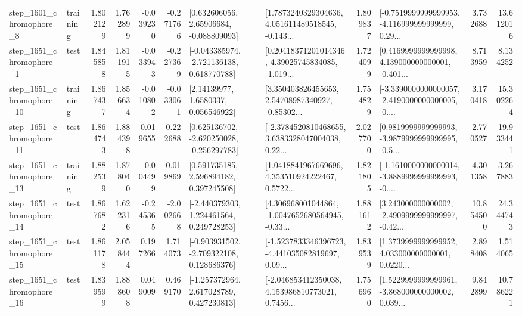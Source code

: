 \begin{tabular}{llrrrrllrlrr}
  step\_1601\_chromophore\_8 &  training &      1.802129 &    1.762899 &     -0.039230 & -0.271766 &     [0.632606056, 2.65906684, -0.088809093] &  [1.7873240329304636, 4.051611489518545, -0.143... &       1.809837 &  [-0.7519999999999953, -4.116999999999999, 0.29... &            3.732688 &         13.612016 \\
  step\_1651\_chromophore\_1 &      test &      1.845858 &    1.811915 &     -0.033943 & -0.227369 &   [-0.043385974, -2.721136138, 0.618770788] &  [0.20418371201014346, 4.39025745834085, -1.019... &       1.724099 &  [0.4169999999999998, 4.139000000000001, -0.401... &            8.713959 &          8.134252 \\
 step\_1651\_chromophore\_10 &  training &      1.867437 &    1.856634 &     -0.010802 & -0.033061 &        [2.14139977, 1.6580337, 0.056546922] &  [3.350403826455653, 2.54708987340927, -0.85302... &       1.754829 &  [-3.3390000000000057, -2.4190000000000005, -0.... &            3.170418 &         15.302264 \\
 step\_1651\_chromophore\_11 &      test &      1.864743 &    1.884398 &      0.019655 &  0.222688 &   [0.625136702, -2.620250028, -0.256297783] &  [-2.3784520810468655, 3.6383328047004038, 0.22... &       2.027700 &  [0.9819999999999993, -3.9879999999999995, -0.5... &            2.770527 &         19.933441 \\
 step\_1651\_chromophore\_13 &  training &      1.882539 &    1.878040 &     -0.004499 &  0.019869 &     [0.591735185, 2.596894182, 0.397245508] &  [1.0418841967669696, 4.353510924222467, 0.5722... &       1.821805 &  [-1.1610000000000014, -3.8889999999999993, -0.... &            4.301358 &          3.267883 \\
 step\_1651\_chromophore\_14 &      test &      1.867682 &    1.622316 &     -0.245365 & -2.002668 &    [-2.440379303, 1.224461564, 0.249728253] &  [4.306968001044864, -1.0047652680564945, -0.33... &       1.881612 &  [3.243000000000002, -2.4909999999999997, -0.42... &           10.854500 &         24.344743 \\
 step\_1651\_chromophore\_15 &      test &      1.861178 &    2.058444 &      0.197266 &  1.714073 &   [-0.903931502, -2.709322108, 0.128686376] &  [-1.5237833346396723, -4.441035082819697, 0.09... &       1.839539 &  [1.3739999999999952, 4.033000000000001, 0.0220... &            2.898408 &          1.514065 \\
 step\_1651\_chromophore\_16 &      test &      1.839599 &    1.888608 &      0.049009 &  0.469170 &    [-1.257372964, 2.617028789, 0.427230813] &  [-2.046853412350038, 4.153986810773021, 0.7456... &       1.756960 &  [1.5229999999999961, -3.868000000000002, 0.039... &            9.842899 &         10.786221 \\

\end{tabular}
